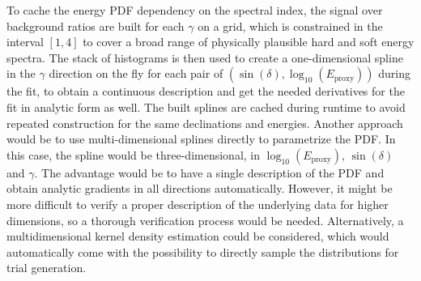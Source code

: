 To cache the energy PDF dependency on the spectral index, the signal over background ratios are built for each $\gamma$ on a grid, which is constrained in the interval $[1, 4]$ to cover a broad range of physically plausible hard and soft energy spectra.
The stack of histograms is then used to create a one-dimensional spline in the $\gamma$ direction on the fly for each pair of $\left(\sin(\delta), \log_{10}\left(E_\text{proxy}\right)\right)$ during the fit, to obtain a continuous description and get the needed derivatives for the fit in analytic form as well.
The built splines are cached during runtime to avoid repeated construction for the same declinations and energies.
Another approach would be to use multi-dimensional splines directly to parametrize the PDF.
In this case, the spline would be three-dimensional, in $\log_{10}\left(E_\text{proxy}\right)$, $\sin(\delta)$ and $\gamma$.
The advantage would be to have a single description of the PDF and obtain analytic gradients in all directions automatically.
However, it might be more difficult to verify a proper description of the underlying data for higher dimensions, so a thorough verification process would be needed.
Alternatively, a multidimensional kernel density estimation could be considered, which would automatically come with the possibility to directly sample the distributions for trial generation.


